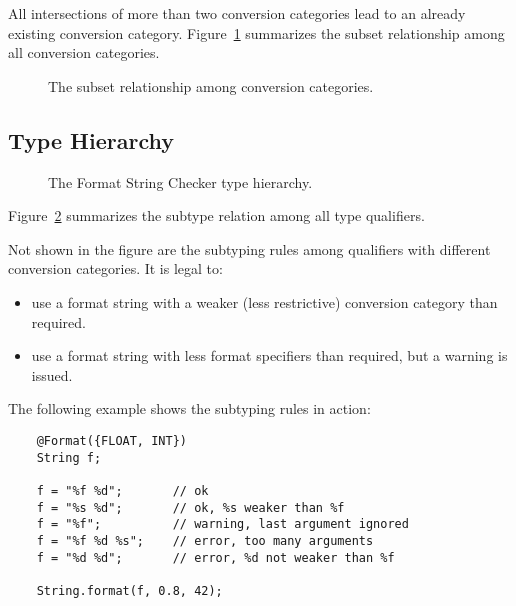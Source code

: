 \noindent All intersections of more than two conversion categories lead to an already
existing conversion category. Figure~\ref{fig:formatter-cat} summarizes the subset 
relationship among all conversion categories.

\begin{figure}[thbp]
    \caption{The subset relationship among conversion categories.}
    \label{fig:formatter-cat}
\end{figure}

\subsection{Type Hierarchy}

\begin{figure}[thbp]
\caption{The Format String Checker type hierarchy.}
\label{fig:formatter-th}
\end{figure}

\noindent Figure~\ref{fig:formatter-th} summarizes the subtype relation among all type
qualifiers.  

% 

Not shown in the figure are the subtyping rules among  qualifiers
with different conversion categories. It is legal to:

\begin{itemize}
\item use a format string with a weaker (less restrictive) conversion category than required.
\item use a format string with less format specifiers than required, but a warning is issued. 
\end{itemize}

The following example shows the subtyping rules in action:

\begin{Verbatim}
    @Format({FLOAT, INT}) 
    String f;

    f = "%f %d";       // ok
    f = "%s %d";       // ok, %s weaker than %f
    f = "%f";          // warning, last argument ignored
    f = "%f %d %s";    // error, too many arguments
    f = "%d %d";       // error, %d not weaker than %f

    String.format(f, 0.8, 42);
\end{Verbatim}

